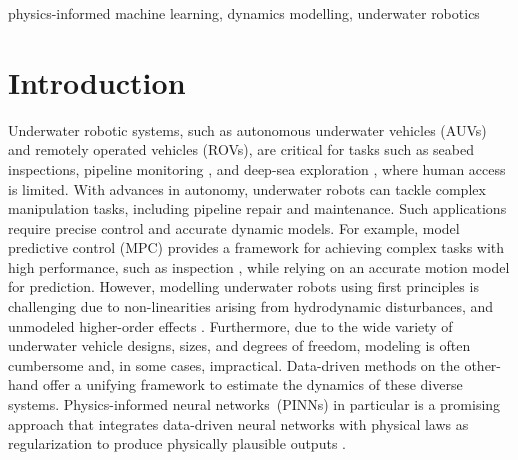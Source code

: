 \documentclass[conference]{IEEEtran}
\begin{document}
\begin{IEEEkeywords}
physics-informed machine learning, dynamics modelling, underwater robotics
\end{IEEEkeywords}


\section{Introduction} %
Underwater robotic systems, such as autonomous underwater vehicles (AUVs) and remotely operated vehicles (ROVs), are critical for tasks such as seabed inspections, pipeline monitoring \cite{amer2023unav}, and deep-sea exploration \cite{kunz2008deep}, where human access is limited. With advances in autonomy, underwater robots can tackle complex manipulation tasks, including pipeline repair and maintenance. 
%
%
Such applications require precise control and accurate dynamic models. For example, model predictive control (MPC) provides a framework for achieving complex tasks with high performance, such as inspection \cite{amer2023visual}, while relying on an accurate motion model for prediction. However, modelling underwater robots using first principles is challenging due to non-linearities arising from hydrodynamic disturbances, and unmodeled higher-order effects \cite{lakshminarayanan2024estimation}. Furthermore, due to the wide variety of underwater vehicle designs, sizes, and degrees of freedom, modeling is often cumbersome and, in some cases, impractical. Data-driven methods on the other-hand offer a unifying framework to estimate the dynamics of these diverse systems.
%
Physics-informed neural networks~(PINNs) in particular is a promising approach that integrates data-driven neural networks with physical laws as regularization to produce physically plausible outputs \cite{karniadakis2021physics}. 
\end{document}
